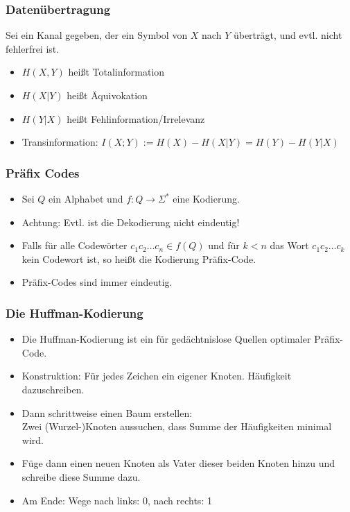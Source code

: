 \documentclass{beamer}
\newcommand{\F}{\Sigma^*}
\begin{document}
\begin{frame}
\frametitle{Datenübertragung}
Sei ein Kanal gegeben, der ein Symbol von $X$ nach $Y$ überträgt, und evtl. nicht fehlerfrei ist.
\begin{itemize}
\item $H(X,Y)$ heißt Totalinformation
\item $H(X|Y)$ heißt Äquivokation
\item $H(Y|X)$ heißt Fehlinformation/Irrelevanz\pause
\item Transinformation: $I(X;Y):=H(X)-H(X|Y)=H(Y)-H(Y|X)$
\end{itemize}
\end{frame}

\begin{frame}
\frametitle{Präfix Codes}
\begin{itemize}
\item Sei $Q$ ein Alphabet und $f:Q\to \F$ eine Kodierung.\pause
\item Achtung: Evtl. ist die Dekodierung nicht eindeutig!\pause
\item Falls für alle Codewörter $c_1c_2\ldots c_n\in f(Q)$ und für $k<n$ das Wort $c_1c_2\ldots c_k$ kein Codewort ist, so heißt die Kodierung Präfix-Code.
\item Präfix-Codes sind immer eindeutig.
\end{itemize}
\end{frame}

\begin{frame}
\frametitle{Die Huffman-Kodierung}
\begin{itemize}
\item Die Huffman-Kodierung ist ein für gedächtnislose Quellen optimaler Präfix-Code.
\vspace{1cm}\pause
\item Konstruktion: Für jedes Zeichen ein eigener Knoten. Häufigkeit dazuschreiben.\pause
\item Dann schrittweise einen Baum erstellen:\\
Zwei (Wurzel-)Knoten aussuchen, dass Summe der Häufigkeiten minimal wird.
\item Füge dann einen neuen Knoten als Vater dieser beiden Knoten hinzu und schreibe diese Summe dazu.\pause
\item Am Ende: Wege nach links: 0, nach rechts: 1
\end{itemize}
\end{frame}
\end{document}
